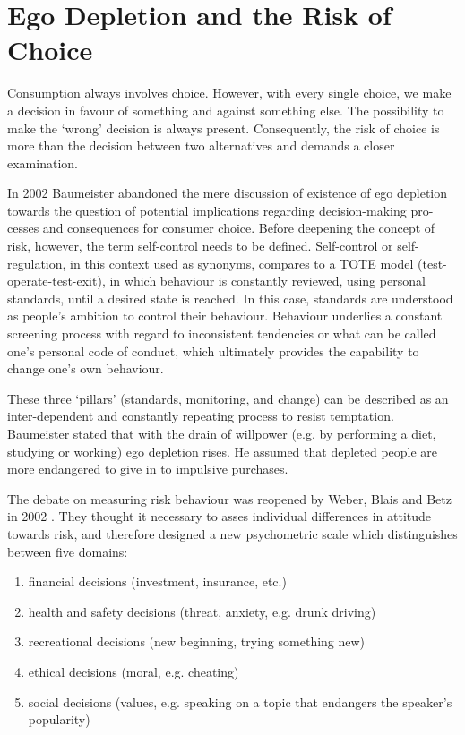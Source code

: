 \section{Ego Depletion and the Risk of Choice}
Consumption always involves choice. However, with every single choice, we make a decision in favour of something and against something else. The possibility to make the ‘wrong’ decision is always present. Consequently, the risk of choice is more than the decision between two alternatives and demands a closer examination.\par
In 2002 Baumeister \citep{baumeister2002yielding} abandoned the mere discussion of existence of ego depletion towards the question of potential implications regarding decision-making pro-cesses and consequences for consumer choice. Before deepening the concept of risk, however, the term self-control needs to be defined. Self-control or self-regulation, in this context used as synonyms, compares to a TOTE model (test-operate-test-exit), in which behaviour is constantly reviewed, using personal standards, until a desired state is reached. In this case, standards are understood as people’s ambition to control their behaviour. Behaviour underlies a constant screening process with regard to inconsistent tendencies or what can be called one’s personal code of conduct, which ultimately provides the capability to change one’s own behaviour.\par
These three ‘pillars’ (standards, monitoring, and change) can be described as an inter-dependent and constantly repeating process to resist temptation. Baumeister stated that with the drain of willpower (e.g. by performing a diet, studying or working) ego depletion rises. He assumed that depleted people are more endangered to give in to impulsive purchases. \par
The debate on measuring risk behaviour was reopened by Weber, Blais and Betz in 2002 \citep{weber2002domain}. They thought it necessary to asses individual differences in attitude towards risk, and therefore designed a new psychometric scale which distinguishes between five domains: 
\begin{enumerate}[1.]
	\item financial decisions (investment, insurance, etc.)
	\item health and safety decisions (threat, anxiety, e.g. drunk driving)
	\item recreational decisions (new beginning, trying something new)
	\item ethical decisions (moral, e.g. cheating) 
	\item social decisions (values, e.g. speaking on a topic that endangers the speaker's popularity)
\end{enumerate}\
